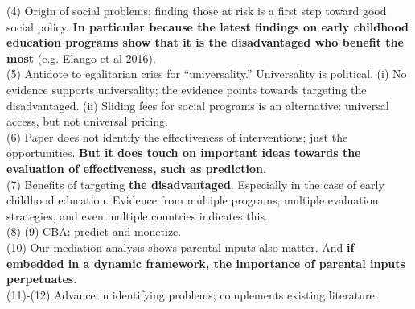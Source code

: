 \noindent (4) Origin of social problems; finding those at risk is a first step toward good social policy. \textbf{In particular because the latest findings on early childhood education programs show that it is the disadvantaged who benefit the most} (e.g. Elango et al 2016).\\

\noindent (5) Antidote to egalitarian cries for ``universality.'' Universality is political. (i) No evidence supports universality; the evidence points towards targeting the disadvantaged. (ii) Sliding fees for social programs is an alternative: universal access, but not universal pricing.\\

\noindent (6) Paper does not identify the effectiveness of interventions; just the opportunities. \textbf{But it does touch on important ideas towards the evaluation of effectiveness, such as prediction}.\\

\noindent (7) Benefits of targeting \textbf{the disadvantaged}. Especially in the case of early childhood education. Evidence from multiple programs, multiple evaluation strategies, and even multiple countries indicates this.\\ 

\noindent (8)-(9) CBA: predict and monetize.\\

\noindent (10) Our mediation analysis shows parental inputs also matter. And \textbf{if embedded in a dynamic framework, the importance of parental inputs perpetuates.}\\

\noindent (11)-(12) Advance in identifying problems; complements existing literature.\\

